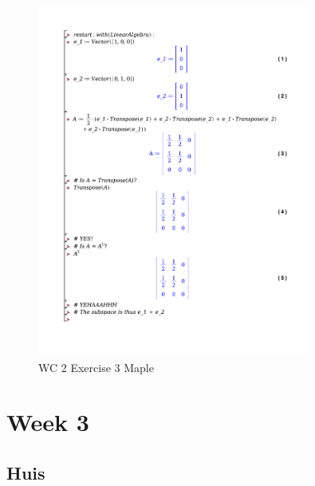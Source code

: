 \documentclass[a4paper]{report}
\begin{document}
\begin{figure}[H]
	\centering
	\includegraphics[width=0.8\textwidth]{exercises/wc_2_ex_3.pdf}
	\caption{WC 2 Exercise 3 Maple}
	\label{fig:wc_2_ex_3_maple}
\end{figure}

\section{Week 3}

\subsection{Huis}
\end{document}
